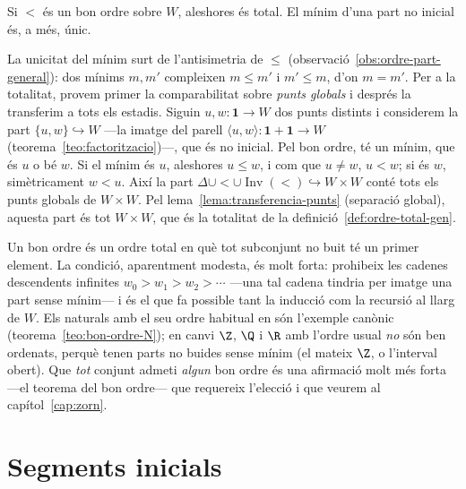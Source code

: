 \begin{proposicio}\label{prop:bon-ordre-total}
Si \({<}\) és un bon ordre sobre \(W\), aleshores és total. El mínim d'una
part no inicial és, a més, únic.
\end{proposicio}

\begin{prova}
La unicitat del mínim surt de l'antisimetria de \(\le\)
(observació~\ref{obs:ordre-part-general}): dos mínims \(m,m'\) compleixen
\(m\le m'\) i \(m'\le m\), d'on \(m=m'\). Per a la totalitat, provem primer la
comparabilitat sobre \emph{punts globals} i després la transferim a tots els
estadis. Siguin \(u,w\colon\mathbf1\to W\) dos punts distints i considerem la
part \(\{u,w\}\hookrightarrow W\) ---la imatge del parell
\(\langle u,w\rangle\colon\mathbf1+\mathbf1\to W\)
(teorema~\ref{teo:factoritzacio})---, que és no inicial. Pel bon ordre, té un
mínim, que és \(u\) o bé \(w\). Si el mínim és \(u\), aleshores \(u\le w\), i
com que \(u\neq w\), \(u<w\); si és \(w\), simètricament \(w<u\). Així la part
\(\Delta\cup{<}\cup\operatorname{Inv}(<)\hookrightarrow W\times W\) conté
tots els punts globals de \(W\times W\). Pel
lema~\ref{lema:transferencia-punts} (separació global), aquesta part és tot
\(W\times W\), que és la totalitat de la definició~\ref{def:ordre-total-gen}.
\end{prova}

\begin{observacio}\label{obs:bon-ordre-classic}
Un bon ordre és un ordre total en què tot subconjunt no buit té un primer
element. La condició, aparentment modesta, és molt forta: prohibeix les
cadenes descendents infinites \(w_0>w_1>w_2>\cdots\) ---una tal cadena tindria
per imatge una part sense mínim--- i és el que fa possible tant la inducció
com la recursió al llarg de \(W\). Els naturals amb el seu ordre habitual en
són l'exemple canònic (teorema~\ref{teo:bon-ordre-N}); en canvi \(\Z\), \(\Q\)
i \(\R\) amb l'ordre usual \emph{no} són ben ordenats, perquè tenen parts no
buides sense mínim (el mateix \(\Z\), o l'interval obert). Que \emph{tot}
conjunt admeti \emph{algun} bon ordre és una afirmació molt més forta ---el
teorema del bon ordre--- que requereix l'elecció i que veurem al
capítol~\ref{cap:zorn}.
\end{observacio}

\section{Segments inicials}\label{sec:segments}

